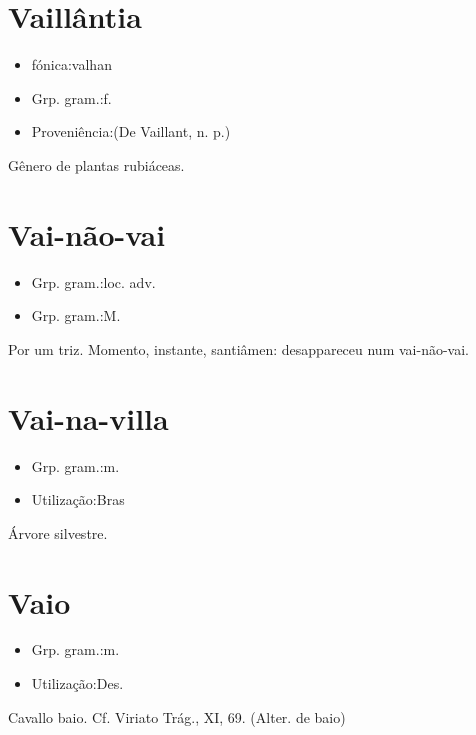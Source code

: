 \documentclass{article}
\begin{document}
\section{Vaillântia}
\begin{itemize}
\item {fónica:valhan}
\end{itemize}
\begin{itemize}
\item {Grp. gram.:f.}
\end{itemize}
\begin{itemize}
\item {Proveniência:(De \textunderscore Vaillant\textunderscore , n. p.)}
\end{itemize}
Gênero de plantas rubiáceas.
\section{Vai-não-vai}
\begin{itemize}
\item {Grp. gram.:loc. adv.}
\end{itemize}
\begin{itemize}
\item {Grp. gram.:M.}
\end{itemize}
Por um triz.
Momento, instante, santiâmen: \textunderscore desappareceu num vai-não-vai\textunderscore .
\section{Vai-na-villa}
\begin{itemize}
\item {Grp. gram.:m.}
\end{itemize}
\begin{itemize}
\item {Utilização:Bras}
\end{itemize}
Árvore silvestre.
\section{Vaio}
\begin{itemize}
\item {Grp. gram.:m.}
\end{itemize}
\begin{itemize}
\item {Utilização:Des.}
\end{itemize}
Cavallo baio. Cf. \textunderscore Viriato Trág.\textunderscore , XI, 69.
(Alter. de \textunderscore baio\textunderscore )
\end{document}
